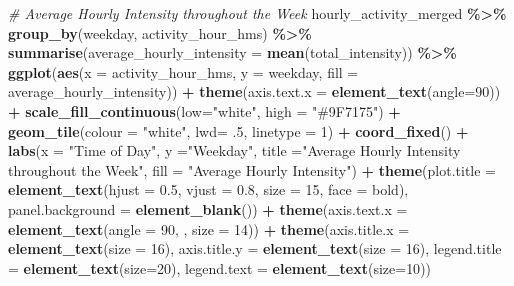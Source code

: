 \documentclass[
]{article}
\newenvironment{Shaded}{\begin{snugshade}}{\end{snugshade}}
\newcommand{\AttributeTok}[1]{\textcolor[rgb]{0.13,0.29,0.53}{#1}}
\newcommand{\CommentTok}[1]{\textcolor[rgb]{0.56,0.35,0.01}{\textit{#1}}}
\newcommand{\DecValTok}[1]{\textcolor[rgb]{0.00,0.00,0.81}{#1}}
\newcommand{\FloatTok}[1]{\textcolor[rgb]{0.00,0.00,0.81}{#1}}
\newcommand{\FunctionTok}[1]{\textcolor[rgb]{0.13,0.29,0.53}{\textbf{#1}}}
\newcommand{\NormalTok}[1]{#1}
\newcommand{\SpecialCharTok}[1]{\textcolor[rgb]{0.81,0.36,0.00}{\textbf{#1}}}
\newcommand{\StringTok}[1]{\textcolor[rgb]{0.31,0.60,0.02}{#1}}
\begin{document}
\begin{Shaded}
\begin{Highlighting}[]
\CommentTok{\# Average Hourly Intensity throughout the Week}
\NormalTok{hourly\_activity\_merged }\SpecialCharTok{\%\textgreater{}\%}
 \FunctionTok{group\_by}\NormalTok{(weekday, activity\_hour\_hms) }\SpecialCharTok{\%\textgreater{}\%}
 \FunctionTok{summarise}\NormalTok{(}\AttributeTok{average\_hourly\_intensity =} \FunctionTok{mean}\NormalTok{(total\_intensity)) }\SpecialCharTok{\%\textgreater{}\%} 
 \FunctionTok{ggplot}\NormalTok{(}\FunctionTok{aes}\NormalTok{(}\AttributeTok{x =}\NormalTok{ activity\_hour\_hms, }\AttributeTok{y =}\NormalTok{ weekday, }\AttributeTok{fill =}\NormalTok{ average\_hourly\_intensity)) }\SpecialCharTok{+}
 \FunctionTok{theme}\NormalTok{(}\AttributeTok{axis.text.x =} \FunctionTok{element\_text}\NormalTok{(}\AttributeTok{angle=}\DecValTok{90}\NormalTok{)) }\SpecialCharTok{+}
 \FunctionTok{scale\_fill\_continuous}\NormalTok{(}\AttributeTok{low=}\StringTok{"white"}\NormalTok{, }\AttributeTok{high =} \StringTok{"\#9F7175"}\NormalTok{) }\SpecialCharTok{+}
 \FunctionTok{geom\_tile}\NormalTok{(}\AttributeTok{colour =} \StringTok{"white"}\NormalTok{, }\AttributeTok{lwd=}\NormalTok{ .}\DecValTok{5}\NormalTok{, }\AttributeTok{linetype =} \DecValTok{1}\NormalTok{) }\SpecialCharTok{+} 
 \FunctionTok{coord\_fixed}\NormalTok{() }\SpecialCharTok{+} 
 \FunctionTok{labs}\NormalTok{(}\AttributeTok{x =} \StringTok{"Time of Day"}\NormalTok{, }\AttributeTok{y =}\StringTok{"Weekday"}\NormalTok{, }\AttributeTok{title =}\StringTok{"Average Hourly Intensity throughout the Week"}\NormalTok{, }\AttributeTok{fill =} \StringTok{"Average Hourly Intensity"}\NormalTok{) }\SpecialCharTok{+}
 \FunctionTok{theme}\NormalTok{(}\AttributeTok{plot.title =} \FunctionTok{element\_text}\NormalTok{(}\AttributeTok{hjust =} \FloatTok{0.5}\NormalTok{, }\AttributeTok{vjust =} \FloatTok{0.8}\NormalTok{, }\AttributeTok{size =} \DecValTok{15}\NormalTok{, }\AttributeTok{face =} \StringTok{\textquotesingle{}bold\textquotesingle{}}\NormalTok{), }\AttributeTok{panel.background =} \FunctionTok{element\_blank}\NormalTok{()) }\SpecialCharTok{+}
 \FunctionTok{theme}\NormalTok{(}\AttributeTok{axis.text.x =} \FunctionTok{element\_text}\NormalTok{(}\AttributeTok{angle =} \DecValTok{90}\NormalTok{, , }\AttributeTok{size =} \DecValTok{14}\NormalTok{)) }\SpecialCharTok{+}
 \FunctionTok{theme}\NormalTok{(}\AttributeTok{axis.title.x =} \FunctionTok{element\_text}\NormalTok{(}\AttributeTok{size =} \DecValTok{16}\NormalTok{),}
       \AttributeTok{axis.title.y =} \FunctionTok{element\_text}\NormalTok{(}\AttributeTok{size =} \DecValTok{16}\NormalTok{),}
       \AttributeTok{legend.title =} \FunctionTok{element\_text}\NormalTok{(}\AttributeTok{size=}\DecValTok{20}\NormalTok{),}
       \AttributeTok{legend.text =} \FunctionTok{element\_text}\NormalTok{(}\AttributeTok{size=}\DecValTok{10}\NormalTok{))}
\end{Highlighting}
\end{Shaded}
\end{document}
